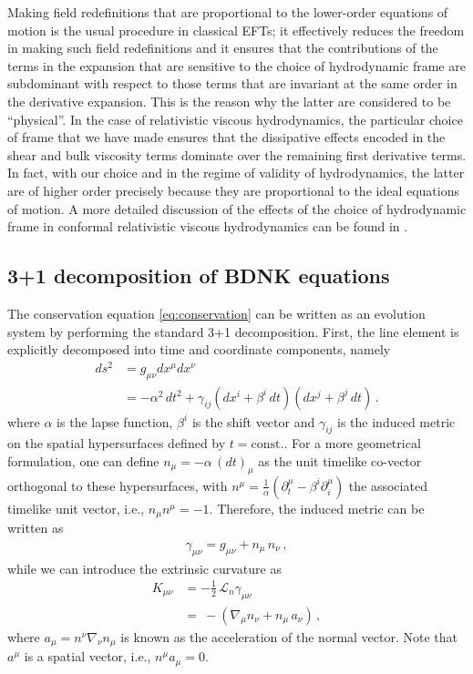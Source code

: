 \documentclass[prd,aps,twocolumn,floats,floatfix,nofootinbib,superscriptaddress] {revtex4-1}
\begin{document}
Making field redefinitions that are proportional to the lower-order equations of motion is the usual procedure in classical EFTs; it effectively reduces the freedom in making such field redefinitions and it ensures that the contributions of the terms in the expansion that are sensitive to the choice of hydrodynamic frame are subdominant with respect to those terms that are invariant at the same order in the derivative expansion. This is the reason why the latter are considered to be  ``physical''. In the case of relativistic viscous hydrodynamics, the particular choice of frame that we have made ensures that the dissipative effects encoded in the shear and bulk viscosity terms dominate over the remaining first derivative terms. In fact, with our choice and in the regime of validity of hydrodynamics, the latter are of higher order precisely because they are proportional to the ideal equations of motion. A more detailed discussion of the effects of the choice of hydrodynamic frame in conformal relativistic viscous hydrodynamics can be found in \cite{Bea:2023rru}.\\

\subsection{3+1 decomposition of BDNK equations}

The conservation equation \eqref{eq:conservation} can be written as an evolution system by performing the standard 3+1 decomposition. First, the line element is explicitly decomposed into time and coordinate components, namely
\begin{align}
ds^2 &= g_{\mu \nu} dx^{\mu} dx^{\nu} \label{metric}\\
&= -\alpha^2\,dt^2+\gamma_{ij}(dx^i+\beta^i\,dt)(dx^j+\beta^j\,dt)\,.\nonumber 
\end{align}
where $\alpha$ is the lapse function, $\beta^i$ is the shift vector and $\gamma_{ij}$ is the induced metric on the spatial hypersurfaces defined by $t=\text{const}.$. For a more geometrical formulation, one can define $n_\mu=-\alpha\,(dt)_\mu$ as the unit timelike co-vector orthogonal to these hypersurfaces, with $n^\mu=\frac{1}{\alpha}(\partial_t^\mu-\beta^i\partial_i^\mu)$ the associated timelike unit vector, i.e., $n_{\mu} n^{\mu}=-1$. 
Therefore, the induced metric can be written as
\begin{align}
\gamma_{\mu\nu} = g_{\mu\nu} +n_\mu\,n_\nu\,,    
\end{align}
while we can introduce the extrinsic curvature as
\begin{align}
K_{\mu\nu} &=-\tfrac{1}{2}\,\mathcal{L}_n\gamma_{\mu\nu} \\
&=~-(\nabla_\mu n_\nu+n_\mu\, a_\nu)\,,
\end{align}
%
where $a_\mu = n^\nu\nabla_\nu n_\mu$ is known as the acceleration of the normal vector. Note that $a^\mu$ is a spatial vector, i.e.,  $n^\mu a_\mu=0$. 
\end{document}
